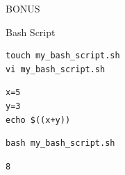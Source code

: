 \documentclass[ignorenonframetext,]{beamer}
\begin{document}
\begin{frame}[fragile]{BONUS}

\begin{block}{Bash Script}

\begin{verbatim}
touch my_bash_script.sh
vi my_bash_script.sh
\end{verbatim}

\begin{verbatim}
x=5
y=3
echo $((x+y))
\end{verbatim}

\begin{verbatim}
bash my_bash_script.sh
\end{verbatim}

\begin{verbatim}
8
\end{verbatim}

\end{block}

\end{frame}
\end{document}
